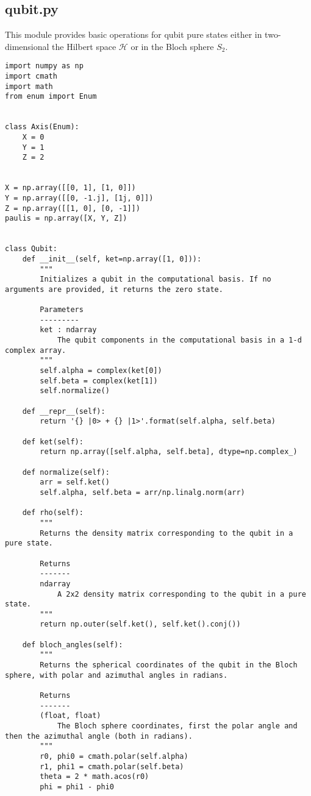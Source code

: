\subsection{qubit.py}\label{section:listing_qubit}
This module provides basic operations for qubit pure states either in two-dimensional the Hilbert space $\mathcal{H}$ or in the Bloch sphere $S_2$. 
\begin{verbatim}
import numpy as np
import cmath
import math
from enum import Enum


class Axis(Enum):
    X = 0
    Y = 1
    Z = 2


X = np.array([[0, 1], [1, 0]])
Y = np.array([[0, -1.j], [1j, 0]])
Z = np.array([[1, 0], [0, -1]])
paulis = np.array([X, Y, Z])


class Qubit:
    def __init__(self, ket=np.array([1, 0])):
        """
        Initializes a qubit in the computational basis. If no arguments are provided, it returns the zero state.

        Parameters
        ---------
        ket : ndarray
            The qubit components in the computational basis in a 1-d complex array.
        """
        self.alpha = complex(ket[0])
        self.beta = complex(ket[1])
        self.normalize()

    def __repr__(self):
        return '{} |0> + {} |1>'.format(self.alpha, self.beta)

    def ket(self):
        return np.array([self.alpha, self.beta], dtype=np.complex_)

    def normalize(self):
        arr = self.ket()
        self.alpha, self.beta = arr/np.linalg.norm(arr)

    def rho(self):
        """
        Returns the density matrix corresponding to the qubit in a pure state.

        Returns
        -------
        ndarray
            A 2x2 density matrix corresponding to the qubit in a pure state.
        """
        return np.outer(self.ket(), self.ket().conj())

    def bloch_angles(self):
        """
        Returns the spherical coordinates of the qubit in the Bloch sphere, with polar and azimuthal angles in radians.

        Returns
        -------
        (float, float)
            The Bloch sphere coordinates, first the polar angle and then the azimuthal angle (both in radians).
        """
        r0, phi0 = cmath.polar(self.alpha)
        r1, phi1 = cmath.polar(self.beta)
        theta = 2 * math.acos(r0)
        phi = phi1 - phi0


\end{verbatim}
